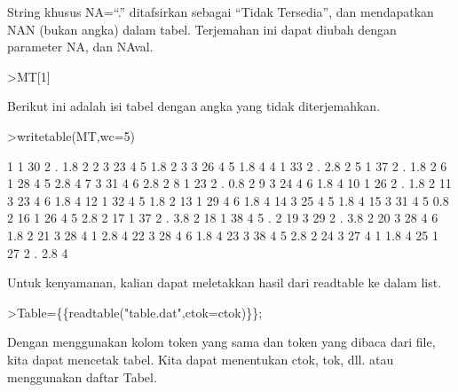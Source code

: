 \documentclass{article}
\begin{document}
\begin{eulernotebook}
\begin{eulercomment}
String khusus NA=“.” ditafsirkan sebagai “Tidak Tersedia”, dan
mendapatkan NAN (bukan angka) dalam tabel. Terjemahan ini dapat diubah
dengan parameter NA, dan NAval.
\end{eulercomment}
\begin{eulerprompt}
>MT[1]
\end{eulerprompt}
\begin{euleroutput}
  [1,  1,  30,  2,  NAN,  1.8,  2]
\end{euleroutput}
\begin{eulercomment}
Berikut ini adalah isi tabel dengan angka yang tidak diterjemahkan.
\end{eulercomment}
\begin{eulerprompt}
>writetable(MT,wc=5)
\end{eulerprompt}
\begin{euleroutput}
      1    1   30    2    .  1.8    2
      2    3   23    4    5  1.8    2
      3    3   26    4    5  1.8    4
      4    1   33    2    .  2.8    2
      5    1   37    2    .  1.8    2
      6    1   28    4    5  2.8    4
      7    3   31    4    6  2.8    2
      8    1   23    2    .  0.8    2
      9    3   24    4    6  1.8    4
     10    1   26    2    .  1.8    2
     11    3   23    4    6  1.8    4
     12    1   32    4    5  1.8    2
     13    1   29    4    6  1.8    4
     14    3   25    4    5  1.8    4
     15    3   31    4    5  0.8    2
     16    1   26    4    5  2.8    2
     17    1   37    2    .  3.8    2
     18    1   38    4    5    .    2
     19    3   29    2    .  3.8    2
     20    3   28    4    6  1.8    2
     21    3   28    4    1  2.8    4
     22    3   28    4    6  1.8    4
     23    3   38    4    5  2.8    2
     24    3   27    4    1  1.8    4
     25    1   27    2    .  2.8    4
\end{euleroutput}
\begin{eulercomment}
Untuk kenyamanan, kalian dapat meletakkan hasil dari readtable ke
dalam list.
\end{eulercomment}
\begin{eulerprompt}
>Table=\{\{readtable("table.dat",ctok=ctok)\}\};
\end{eulerprompt}
\begin{eulercomment}
Dengan menggunakan kolom token yang sama dan token yang dibaca dari
file, kita dapat mencetak tabel. Kita dapat menentukan ctok, tok, dll.
atau menggunakan daftar Tabel.
\end{eulercomment}
\begin{eulerprompt}

\end{eulerprompt}
\end{eulernotebook}
\end{document}
